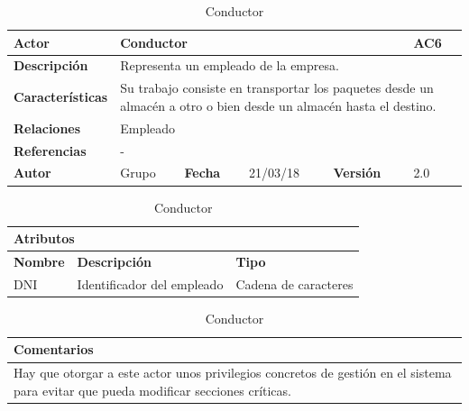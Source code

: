 \documentclass[12pt,spanish]{article}
\begin{document}
\begin{table}[H]

\centering
\begin{tabular}{|m{3cm}|m{4cm}|m{2cm}|m{2cm}|m{2cm}|m{1cm}|}
\hline
\textbf{Actor} &  \multicolumn{4}{m{8cm}|}{Conductor} \vline &  \cellcolor{gray!40}AC6 \\
\hline
\textbf{Descripción} & \multicolumn{5}{m{8cm}|}{Representa un empleado de la empresa.} \\
\hline
\textbf{Características} & \multicolumn{5}{m{8cm}|}{Su trabajo consiste en transportar los paquetes desde un almacén a otro o bien desde un almacén hasta el destino.} \\
\hline
\textbf{Relaciones} &\multicolumn{5}{m{8cm}|}{Empleado} \\
\hline
\textbf{Referencias} & \multicolumn{5}{m{8cm}|}{-} \\
\hline
\textbf{Autor} & Grupo & \textbf{Fecha} & 21/03/18 & \textbf{Versión} & 2.0 \\
\hline
\end{tabular}

\vspace{1cm}

\begin{tabular}{|m{4cm}|m{7.3cm}|m{4cm}|}
\hline
\multicolumn{3}{|m{15.3cm}|}{\textbf{Atributos}} \\
\hline
\textbf{Nombre} & \textbf{Descripción} & \textbf{Tipo} \\
\hline
DNI & Identificador del empleado & Cadena de caracteres \\
\hline
\end{tabular}


\vspace{1cm}

\begin{tabular}{|m{16.2cm}|}
\hline
\textbf{Comentarios} \\
\hline
Hay que otorgar a este actor unos privilegios concretos de gestión en el sistema para evitar que pueda modificar secciones críticas. \\
\hline
\end{tabular}

\caption{Conductor}

\end{table}
\end{document}
